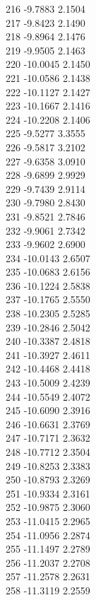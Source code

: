 \documentclass[11pt]{article}
\theoremstyle{definition}
\theoremstyle{plain}
\begin{document}
{216 -9.7883 2.1504\\
217 -9.8423 2.1490\\
218 -9.8964 2.1476\\
219 -9.9505 2.1463\\
220 -10.0045 2.1450\\
221 -10.0586 2.1438\\
222 -10.1127 2.1427\\
223 -10.1667 2.1416\\
224 -10.2208 2.1406\\
225 -9.5277 3.3555\\
226 -9.5817 3.2102\\
227 -9.6358 3.0910\\
228 -9.6899 2.9929\\
229 -9.7439 2.9114\\
230 -9.7980 2.8430\\
231 -9.8521 2.7846\\
232 -9.9061 2.7342\\
233 -9.9602 2.6900\\
234 -10.0143 2.6507\\
235 -10.0683 2.6156\\
236 -10.1224 2.5838\\
237 -10.1765 2.5550\\
238 -10.2305 2.5285\\
239 -10.2846 2.5042\\
240 -10.3387 2.4818\\
241 -10.3927 2.4611\\
242 -10.4468 2.4418\\
243 -10.5009 2.4239\\
244 -10.5549 2.4072\\
245 -10.6090 2.3916\\
246 -10.6631 2.3769\\
247 -10.7171 2.3632\\
248 -10.7712 2.3504\\
249 -10.8253 2.3383\\
250 -10.8793 2.3269\\
251 -10.9334 2.3161\\
252 -10.9875 2.3060\\
253 -11.0415 2.2965\\
254 -11.0956 2.2874\\
255 -11.1497 2.2789\\
256 -11.2037 2.2708\\
257 -11.2578 2.2631\\
258 -11.3119 2.2559\\
}
\end{document}

